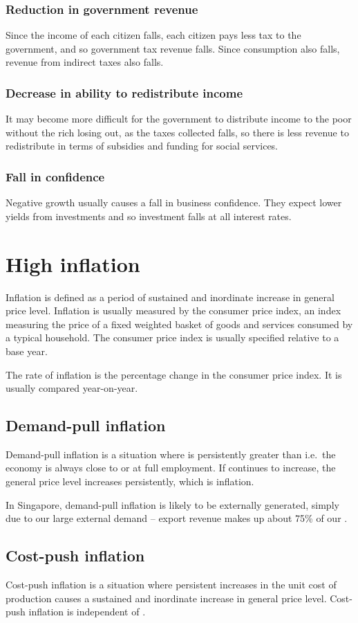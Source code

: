\documentclass[Economics.tex]{subfiles}
\begin{document}
\subsubsection{Reduction in government revenue}
Since the income of each citizen falls, each citizen pays less tax to the government, and so government tax revenue falls. Since consumption also falls, revenue from indirect taxes also falls.
\subsubsection{Decrease in ability to redistribute income}
It may become more difficult for the government to distribute income to the poor without the rich losing out, as the taxes collected falls, so there is less revenue to redistribute in terms of subsidies and funding for social services.
\subsubsection{Fall in confidence}
Negative growth usually causes a fall in business confidence. They expect lower yields from investments and so investment falls at all interest rates.
\section{High inflation}
Inflation is defined as a period of sustained and inordinate increase in general price level. Inflation is usually measured by the consumer price index, an index measuring the price of a fixed weighted basket of goods and services consumed by a typical household. The consumer price index is usually specified relative to a base year.

The rate of inflation is the percentage change in the consumer price index. It is usually compared year-on-year.
\subsection{Demand-pull inflation}
Demand-pull inflation is a situation where \AD{} is persistently greater than \AS{} i.e.\ the economy is always close to or at full employment. If \AD{} continues to increase, the general price level increases persistently, which is inflation.

In Singapore, demand-pull inflation is likely to be externally generated, simply due to our large external demand -- export revenue makes up about 75\% of our \AD{}.
\subsection{Cost-push inflation}
Cost-push inflation is a situation where persistent increases in the unit cost of production causes a sustained and inordinate increase in general price level. Cost-push inflation is independent of \AD{}.
\end{document}
